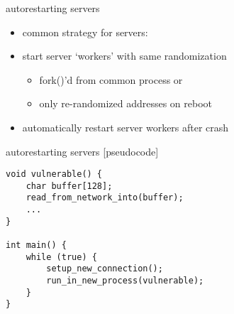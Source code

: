 \begin{frame}{autorestarting servers}
    \begin{itemize}
    \item common strategy for servers:
    \item start server `workers' with same randomization
        \begin{itemize}
        \item fork()'d from common process or
        \item only re-randomized addresses on reboot
        \end{itemize}
    \item automatically restart server workers after crash
    \end{itemize}
\end{frame}

\begin{frame}[fragile]{autorestarting servers [pseudocode]}
\begin{Verbatim}
void vulnerable() {
    char buffer[128];
    read_from_network_into(buffer);
    ...
}

int main() {
    while (true) {
        setup_new_connection();
        run_in_new_process(vulnerable);
    }
}
\end{Verbatim}
\end{frame}

